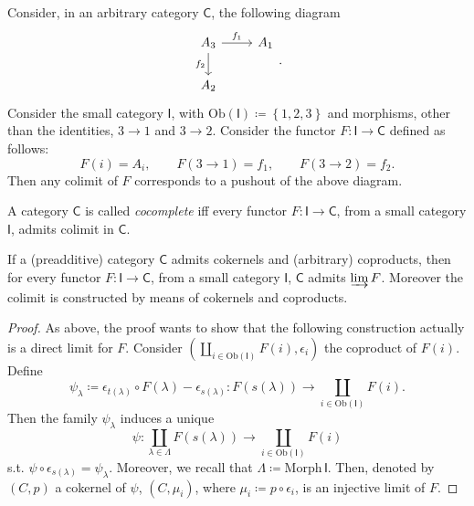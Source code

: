\begin{ex}
	Consider, in an arbitrary category $\mathsf{C}$, the following diagram
	\begin{equation}
	\begin{tikzcd}
		A_3 \arrow[r, "f_1", rightarrow] \arrow[d, "f_2"', rightarrow] &
		A_1\\
		A_2
	\end{tikzcd}
	.\end{equation} 
	Consider the small category $\mathsf{I}$, with $\mathrm{Ob} \left(\mathsf{I}\right) \coloneqq \left\{ 1, 2, 3 \right\}$ and morphisms, other than the identities, $3 \to 1$ and $3 \to 2$.
	Consider the functor $F\colon \mathsf{I} \to \mathsf{C}$ defined as follows:
	\begin{equation}
		F(i) = A_i, \qquad F( 3 \to 1 ) = f_1, \qquad
		F( 3 \to 2 ) = f_2
	.\end{equation} 
	Then any colimit of $F$ corresponds to a pushout of the above diagram.
\end{ex} 

\begin{defn}
	A category $\mathsf{C}$ is called {\em cocomplete} iff every functor $F\colon \mathsf{I} \to \mathsf{C}$, from a small category $\mathsf{I}$, admits colimit in $\mathsf{C}$.
\end{defn}

\begin{prop}\label{prop:ColimConstr}
	If a (preadditive) category $\mathsf{C}$ admits cokernels and (arbitrary) coproducts, then
	for every functor $F\colon \mathsf{I} \to \mathsf{C}$, from a small category $\mathsf{I}$, $\mathsf{C}$ admits $\varinjlim F$.
	Moreover the colimit is constructed by means of cokernels and coproducts.
\end{prop} 
\begin{proof}
	As above, the proof wants to show that the following construction actually is a direct limit for $F$.
	Consider $\left(\coprod_{i \in \mathrm{Ob} \left(\mathsf{I}\right)} F(i), \epsilon_i\right)$ the coproduct of $F(i)$.
	Define
	\begin{equation}
		\psi_\lambda \coloneqq \epsilon_{t(\lambda)} \circ F(\lambda) - \epsilon_{s(\lambda)}:
		F \left( s(\lambda)  \right) \to \coprod_{i \in \mathrm{Ob} \left(\mathsf{I}\right)} F(i)
	.\end{equation} 
	Then the family $\psi_\lambda$ induces a unique 
	\begin{equation}
		\psi\colon \coprod_{\lambda \in \Lambda} F \left( s(\lambda) \right) \to \coprod_{i \in \mathrm{Ob} \left(\mathsf{I}\right)} F(i)
	\end{equation} 
	s.t. $\psi \circ \epsilon_{s(\lambda)} = \psi_\lambda$.
	Moreover, we recall that $\Lambda \coloneqq \mathrm{Morph}\, \mathsf{I}$.
	Then, denoted by $\left(C, p\right)$ a cokernel of $\psi$, $\left(C, \mu_i\right)$, where $\mu_i \coloneqq p \circ\epsilon_i$, is an injective limit of $F$.
\end{proof}

